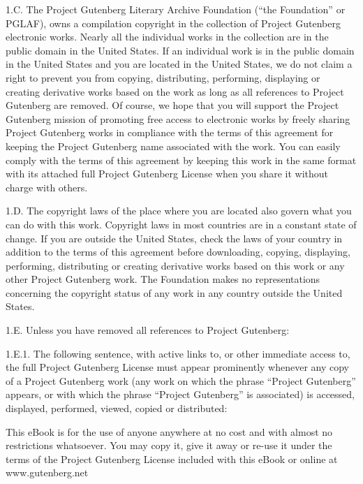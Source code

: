 1.C.  The Project Gutenberg Literary Archive Foundation (``the Foundation''
or PGLAF), owns a compilation copyright in the collection of Project
Gutenberg\texttrademark{} electronic works.  Nearly all the individual works in the
collection are in the public domain in the United States.  If an
individual work is in the public domain in the United States and you are
located in the United States, we do not claim a right to prevent you from
copying, distributing, performing, displaying or creating derivative
works based on the work as long as all references to Project Gutenberg
are removed.  Of course, we hope that you will support the Project
Gutenberg\texttrademark{} mission of promoting free access to electronic works by
freely sharing Project Gutenberg\texttrademark{} works in compliance with the terms of
this agreement for keeping the Project Gutenberg\texttrademark{} name associated with
the work.  You can easily comply with the terms of this agreement by
keeping this work in the same format with its attached full Project
Gutenberg\texttrademark{} License when you share it without charge with others.

1.D.  The copyright laws of the place where you are located also govern
what you can do with this work.  Copyright laws in most countries are in
a constant state of change.  If you are outside the United States, check
the laws of your country in addition to the terms of this agreement
before downloading, copying, displaying, performing, distributing or
creating derivative works based on this work or any other Project
Gutenberg\texttrademark{} work.  The Foundation makes no representations concerning
the copyright status of any work in any country outside the United
States.

1.E.  Unless you have removed all references to Project Gutenberg:

1.E.1.  The following sentence, with active links to, or other immediate
access to, the full Project Gutenberg\texttrademark{} License must appear prominently
whenever any copy of a Project Gutenberg\texttrademark{} work (any work on which the
phrase ``Project Gutenberg'' appears, or with which the phrase ``Project
Gutenberg'' is associated) is accessed, displayed, performed, viewed,
copied or distributed:

This eBook is for the use of anyone anywhere at no cost and with
almost no restrictions whatsoever.  You may copy it, give it away or
re-use it under the terms of the Project Gutenberg License included
with this eBook or online at www.gutenberg.net

